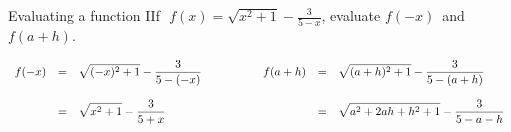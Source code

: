 \begin{example}{Evaluating a function}
	IIf $\,\,\displaystyle{f(x)=\sqrt{x^{2}+1}-\frac{3}{5-x}}$, \hspace{2mm} evaluate $f(-x)\,$  \hspace{2mm} and  \hspace{2mm}  $f(a+h)$.
\end{example}
\begin{solution}
	
	$$\begin{array}{rclrcl }
	f(-x) & = & \displaystyle{\sqrt{(-x)^{2}+1}-\frac{3}{5-(-x)}}  & \hspace{1.5cm} f(a+h) & = & \displaystyle{\sqrt{(a+h)^{2}+1}-\frac{3}{5-(a+h)}} \\
	&&&&& \\
	& = & \displaystyle{\sqrt{x^{2}+1}-\frac{3}{5+x}}         && = & \displaystyle{\sqrt{a^{2}+2ah+h^{2}+1}-\frac{3}{5-a-h}} \\
	\end{array}$$
\end{solution}                    







%

